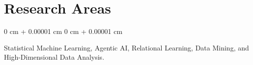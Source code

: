 \documentclass[10pt, letterpaper]{article}
\newenvironment{highlightsforbulletentries}{
    \begin{itemize}[
        topsep=0.10 cm,
        parsep=0.10 cm,
        partopsep=0pt,
        itemsep=0pt,
        leftmargin=10pt
    ]
}{
    \end{itemize}
} %
\newenvironment{onecolentry}{
    \begin{adjustwidth}{
        0 cm + 0.00001 cm
    }{
        0 cm + 0.00001 cm
    }
}{
    \end{adjustwidth}
} %
\begin{document}
    









    \section{Research Areas}
        \begin{onecolentry}
      Statistical Machine Learning, Agentic AI, Relational Learning, Data Mining, and High-Dimensional Data Analysis.
    \end{onecolentry}

        \vspace{0.2 cm}

\end{document}
